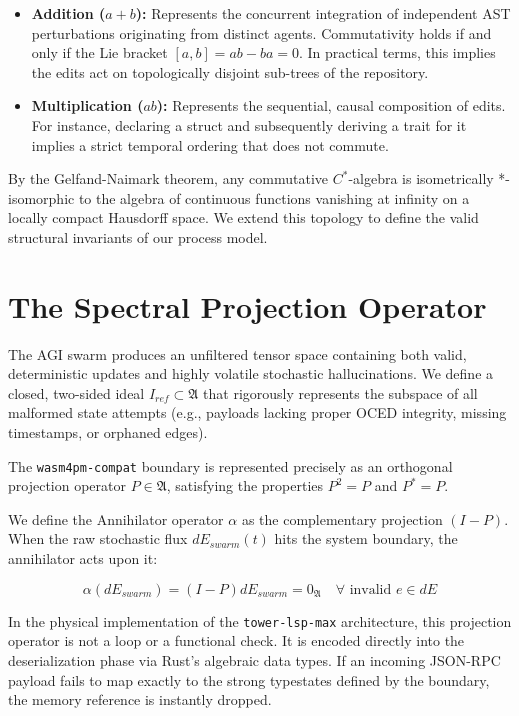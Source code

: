 \begin{itemize}
    \item \textbf{Addition ($a + b$):} Represents the concurrent integration of independent AST perturbations originating from distinct agents. Commutativity holds if and only if the Lie bracket $[a,b] = ab - ba = 0$. In practical terms, this implies the edits act on topologically disjoint sub-trees of the repository.
    \item \textbf{Multiplication ($ab$):} Represents the sequential, causal composition of edits. For instance, declaring a struct and subsequently deriving a trait for it implies a strict temporal ordering that does not commute.
\end{itemize}

By the Gelfand-Naimark theorem, any commutative $C^*$-algebra is isometrically *-isomorphic to the algebra of continuous functions vanishing at infinity on a locally compact Hausdorff space. We extend this topology to define the valid structural invariants of our process model.

\section{The Spectral Projection Operator}

The AGI swarm produces an unfiltered tensor space containing both valid, deterministic updates and highly volatile stochastic hallucinations. We define a closed, two-sided ideal $I_{ref} \subset \mathfrak{A}$ that rigorously represents the subspace of all malformed state attempts (e.g., payloads lacking proper OCED integrity, missing timestamps, or orphaned edges).

The \texttt{wasm4pm-compat} boundary is represented precisely as an orthogonal projection operator $P \in \mathfrak{A}$, satisfying the properties $P^2 = P$ and $P^* = P$. 

We define the Annihilator operator $\alpha$ as the complementary projection $(I - P)$. When the raw stochastic flux $dE_{swarm}(t)$ hits the system boundary, the annihilator acts upon it:

\begin{equation}
\alpha(dE_{swarm}) = (I - P) dE_{swarm} = 0_{\mathfrak{A}} \quad \forall \text{ invalid } e \in dE
\end{equation}

In the physical implementation of the \texttt{tower-lsp-max} architecture, this projection operator is not a loop or a functional check. It is encoded directly into the deserialization phase via Rust's algebraic data types. If an incoming JSON-RPC payload fails to map exactly to the strong typestates defined by the boundary, the memory reference is instantly dropped. 

